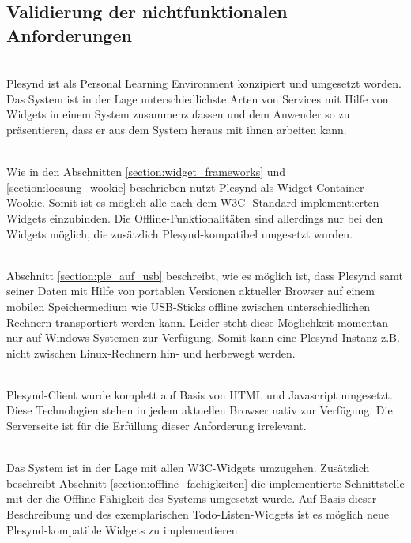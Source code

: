 \subsection{Validierung der nichtfunktionalen Anforderungen}
\textbullet{}  \emph{\requirementAggregator}\\
Plesynd ist als Personal Learning Environment konzipiert und umgesetzt worden. Das System ist in der Lage unterschiedlichste Arten von Services mit Hilfe von Widgets in einem System zusammenzufassen und dem Anwender so zu präsentieren, dass er aus dem System heraus mit ihnen arbeiten kann.

\textbullet{}  \emph{\requirementWidgetStandard}\\
Wie in den Abschnitten \ref{section:widget_frameworks} und \ref{section:loesung_wookie} beschrieben nutzt Plesynd als Widget-Container Wookie. Somit ist es möglich alle nach dem W3C -Standard implementierten Widgets einzubinden. Die Offline-Funktionalitäten sind allerdings nur bei den Widgets möglich, die zusätzlich Plesynd-kompatibel umgesetzt wurden.

\textbullet{}  \emph{\requirementUsbStick}\\
Abschnitt \ref{section:ple_auf_usb} beschreibt, wie es möglich ist, dass Plesynd samt seiner Daten mit Hilfe von portablen Versionen aktueller Browser auf einem mobilen Speichermedium wie USB-Sticks offline zwischen unterschiedlichen Rechnern transportiert werden kann. Leider steht diese Möglichkeit momentan nur auf Windows-Systemen zur Verfügung. Somit kann eine Plesynd Instanz z.B. nicht zwischen Linux-Rechnern hin- und herbewegt werden. 

\textbullet{}  \emph{\requirementUsageInBrowser}\\
Plesynd-Client wurde komplett auf Basis von HTML und Javascript umgesetzt. Diese Technologien stehen in jedem aktuellen Browser nativ zur Verfügung. Die Serverseite ist für die Erfüllung dieser Anforderung irrelevant.

\textbullet{}  \emph{\requirementNewWidgetsWithApi}\\
Das System ist in der Lage mit allen W3C-Widgets umzugehen. Zusätzlich beschreibt Abschnitt \ref{section:offline_faehigkeiten} die implementierte Schnittstelle mit der die Offline-Fähigkeit des Systems umgesetzt wurde. Auf Basis dieser Beschreibung und des exemplarischen Todo-Listen-Widgets ist es möglich neue Plesynd-kompatible Widgets zu implementieren.

